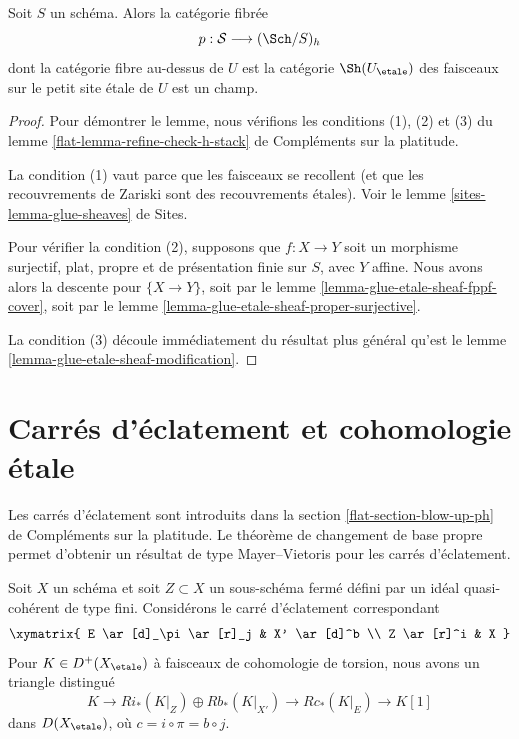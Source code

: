\begin{lemma}
\label{lemma-h-descent-etale-sheaves}
Soit $S$ un schéma. Alors la catégorie fibrée
$$
p : \mathcal{S} \longrightarrow (\Sch/S)_h
$$
dont la catégorie fibre au-dessus de $U$ est la catégorie $\Sh(U_\etale)$
des faisceaux sur le petit site étale de $U$ est un champ.
\end{lemma}

\begin{proof}
Pour démontrer le lemme, nous vérifions les conditions (1), (2) et (3) du
lemme \ref{flat-lemma-refine-check-h-stack} de Compléments sur la platitude.

\medskip\noindent
La condition (1) vaut parce que les faisceaux se recollent (et que les
recouvrements de Zariski sont des recouvrements étales). Voir le
lemme \ref{sites-lemma-glue-sheaves} de Sites.

\medskip\noindent
Pour vérifier la condition (2), supposons que $f : X \to Y$ soit un morphisme
surjectif, plat, propre et de présentation finie sur $S$, avec $Y$ affine.
Nous avons alors la descente pour $\{X \to Y\}$, soit par le
lemme \ref{lemma-glue-etale-sheaf-fppf-cover}, soit par le
lemme \ref{lemma-glue-etale-sheaf-proper-surjective}.

\medskip\noindent
La condition (3) découle immédiatement du résultat plus général qu'est le
lemme \ref{lemma-glue-etale-sheaf-modification}.
\end{proof}



















\section{Carrés d'éclatement et cohomologie étale}
\label{section-blow-up-square}

\noindent
Les carrés d'éclatement sont introduits dans la
section \ref{flat-section-blow-up-ph} de Compléments sur la platitude.
Le théorème de changement de base propre permet d'obtenir
un résultat de type Mayer--Vietoris pour les carrés d'éclatement.

\begin{lemma}
\label{lemma-blow-up-square-cohomological-descent}
Soit $X$ un schéma et soit $Z \subset X$ un sous-schéma fermé
défini par un idéal quasi-cohérent de type fini. Considérons le
carré d'éclatement correspondant
$$
\xymatrix{
E \ar[d]_\pi \ar[r]_j & X' \ar[d]^b \\
Z \ar[r]^i & X
}
$$
Pour $K \in D^+(X_\etale)$ à faisceaux de cohomologie de torsion,
nous avons un triangle distingué
$$
K \to Ri_*(K|_Z) \oplus Rb_*(K|_{X'}) \to Rc_*(K|_E) \to K[1]
$$
dans $D(X_\etale)$, où $c = i \circ \pi = b \circ j$.
\end{lemma}

